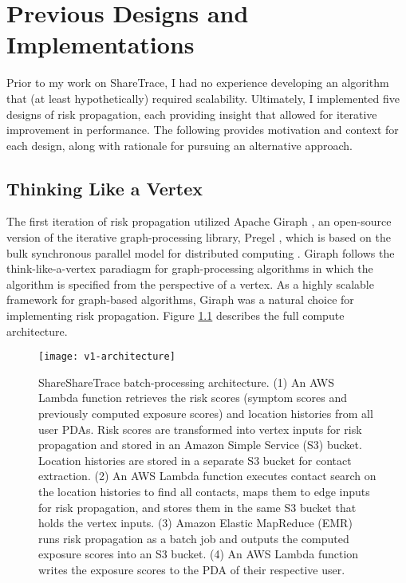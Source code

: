 \chapter{Previous Designs and Implementations}\label{sec:previous-designs}

Prior to my work on ShareTrace, I had no experience developing an algorithm that (at least hypothetically) required scalability. Ultimately, I implemented five designs of risk propagation, each providing insight that allowed for iterative improvement in performance. The following provides motivation and context for each design, along with rationale for pursuing an alternative approach.

\section{Thinking Like a Vertex}\label{sec:giraph}

The first iteration of risk propagation utilized Apache Giraph \cite{Giraph2020}, an open-source version of the iterative graph-processing library, Pregel \cite{Malewicz2010}, which is based on the bulk synchronous parallel model for distributed computing \cite{Valiant1990}. Giraph follows the think-like-a-vertex paradiagm for graph-processing algorithms in which the algorithm is specified from the perspective of a vertex. As a highly scalable framework for graph-based algorithms, Giraph was a natural choice for implementing risk propagation. Figure \ref{fig:v1-architecture} describes the full compute architecture.

\begin{figure}[htbp]
\centering
\texttt{[image: v1-architecture]}
\caption[ShareTrace batch-processing architecture]{ShareShareTrace batch-processing architecture.
(1) An AWS Lambda function retrieves the risk scores (symptom scores and previously computed exposure scores) and location histories from all user PDAs. Risk scores are transformed into vertex inputs for risk propagation and stored in an Amazon Simple Service (S3) bucket. Location histories are stored in a separate S3 bucket for contact extraction. (2) An AWS Lambda function executes contact search on the location histories to find all contacts, maps them to edge inputs for risk propagation, and stores them in the same S3 bucket that holds the vertex inputs. (3) Amazon Elastic MapReduce (EMR) runs risk propagation as a batch job and outputs the computed exposure scores into an S3 bucket. (4) An AWS Lambda function writes the exposure scores to the PDA of their respective user.}
\label{fig:v1-architecture}
\end{figure}

